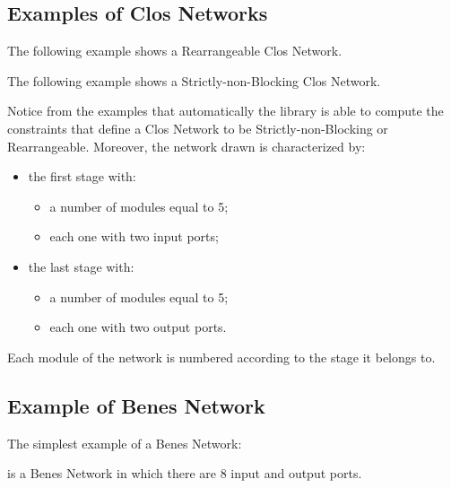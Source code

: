 \documentclass{ltxdoc} %
\begin{document}
\subsection{Examples of Clos Networks}

The following example shows a Rearrangeable Clos Network.

\begin{codeexample}[]
\end{codeexample}

The following example shows a Strictly-non-Blocking Clos Network.

\begin{codeexample}[]
\end{codeexample}

Notice from the examples that automatically the library is able to compute the constraints that define a Clos Network to be Strictly-non-Blocking or Rearrangeable. Moreover, the network drawn is characterized by:
\begin{itemize}
\item the first stage with:
\begin{itemize}
\item a number of modules equal to 5;
\item each one with two input ports;
\end{itemize}
\item the last stage with:
\begin{itemize}
\item a number of modules equal to 5;
\item each one with two output ports.
\end{itemize}
\end{itemize}
Each module of the network is numbered according to the stage it belongs to.

\subsection{Example of Benes Network}

The simplest example of a Benes Network:
\begin{codeexample}[]
\begin{tikzpicture}
    \node[benes] {};
\end{tikzpicture}
\end{codeexample}
is a Benes Network in which there are 8 input and output ports. 
\end{document}
